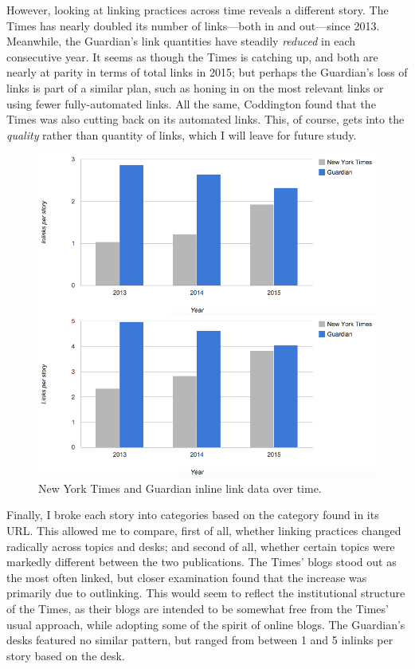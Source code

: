 However, looking at linking practices across time reveals a different story. The Times has nearly doubled its number of links---both in and out---since 2013. Meanwhile, the Guardian's link quantities have steadily \emph{reduced} in each consecutive year. It seems as though the Times is catching up, and both are nearly at parity in terms of total links in 2015; but perhaps the Guardian's loss of links is part of a similar plan, such as honing in on the most relevant links or using fewer fully-automated links. All the same, Coddington found that the Times was also cutting back on its automated links. This, of course, gets into the \emph{quality} rather than quantity of links, which I will leave for future study.

\begin{figure}[ht]
\centering
\includegraphics[width=400pt]{figures/nytvguardian-long}
\caption{New York Times and Guardian inline link data over time.}
\label{fig:nytvguardian-long}
\end{figure}

Finally, I broke each story into categories based on the category found in its URL. This allowed me to compare, first of all, whether linking practices changed radically across topics and desks; and second of all, whether certain topics were markedly different between the two publications. The Times' blogs stood out as the most often linked, but closer examination found that the increase was primarily due to outlinking. This would seem to reflect the institutional structure of the Times, as their blogs are intended to be somewhat free from the Times' usual approach, while adopting some of the spirit of online blogs. The Guardian's desks featured no similar pattern, but ranged from between 1 and 5 inlinks per story based on the desk.

